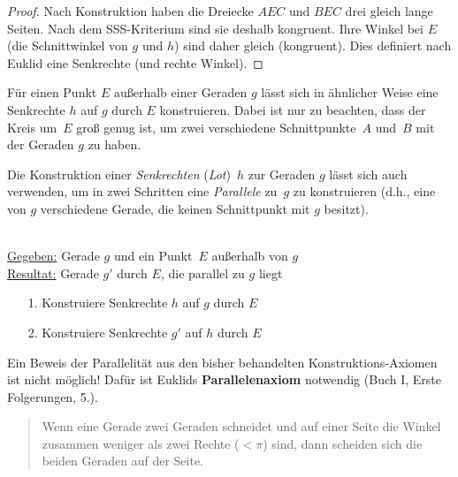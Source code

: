 \begin{proof}
Nach Konstruktion haben die Dreiecke $AEC$ und $BEC$ drei gleich lange
Seiten. Nach dem SSS-Kriterium sind sie deshalb kongruent. Ihre Winkel
bei $E$ (die Schnittwinkel von $g$ und $h$) sind daher gleich
(kongruent). 
Dies definiert nach Euklid eine Senkrechte (und rechte Winkel).
\end{proof}

Für einen Punkt $E$ außerhalb einer Geraden $g$ lässt sich 
in ähnlicher Weise eine Senkrechte $h$ auf $g$ durch $E$ konstruieren.
Dabei ist nur zu beachten, dass der Kreis um~$E$ groß genug ist, um
zwei verschiedene Schnittpunkte~$A$ und~$B$ mit der Geraden $g$ zu
haben.

Die Konstruktion einer  {\em Senkrechten} ({\em Lot})~$h$ zur Geraden $g$
lässt sich auch verwenden, um in zwei Schritten eine {\em Parallele}
zu~$g$ zu konstruieren (d.h., eine von $g$ verschiedene Gerade, die
keinen Schnittpunkt mit $g$ besitzt).



\begin{konst}  
\phantom{Pups}\hspace*{1cm}\phantom{Pups}\\
\underline{Gegeben:} Gerade $g$ und ein Punkt~$E$ außerhalb von $g$\\ 
\underline{Resultat:} Gerade $g'$ durch $E$, die parallel zu $g$ liegt 
\begin{enumerate}
\item[1.] Konstruiere Senkrechte $h$ auf $g$ durch $E$ 
\item[2.] Konstruiere Senkrechte $g'$ auf $h$ durch $E$ 
\end{enumerate}
\end{konst}



Ein Beweis der Parallelität aus den bisher behandelten
Konstruktions-Axiomen ist nicht möglich! %
Dafür ist Euklids {\bf Parallelenaxiom} notwendig (Buch I, Erste
Folgerungen, 5.).
\begin{quote}
Wenn eine Gerade %
zwei Geraden %
schneidet und auf einer Seite die Winkel
zusammen weniger als zwei Rechte ($<\pi$) sind, dann scheiden sich die
beiden Geraden auf der Seite.
\end{quote}



